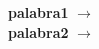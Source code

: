 \begin{defcard}
    \textbf{palabra1} $\rightarrow$ \lipsum[1][1] \\
    \textbf{palabra2} $\rightarrow$ \lipsum[1][1] \\
\end{defcard}